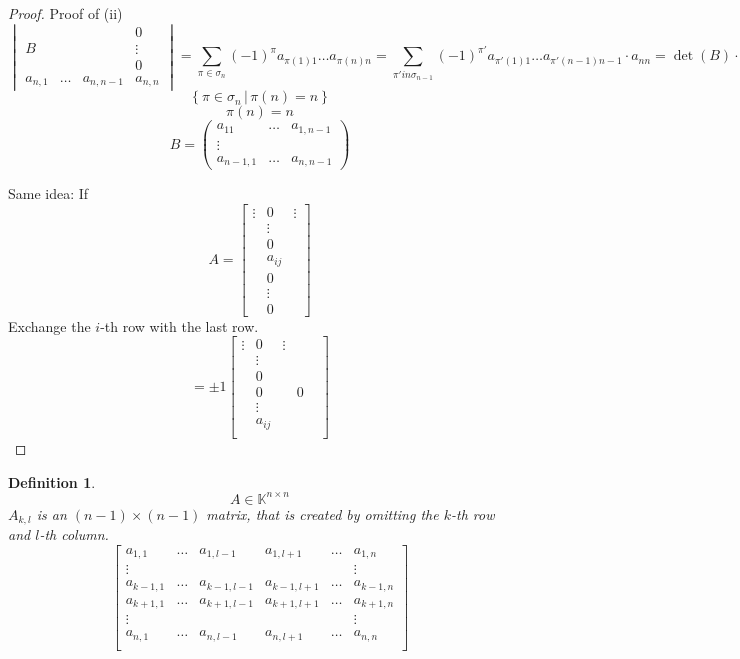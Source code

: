 \documentclass{article}
\newtheorem{definition}{Definition}  \numberwithin{definition}{section}
\newcommand{\setdef}[2]{\left\{\left.#1\,\right|\,#2\right\}}
\begin{document}
\begin{proof}
  Proof of (ii)
  \[
    \begin{vmatrix}
             &         &           & 0  \\
      B      &         &           & \vdots \\
             &         &           & 0  \\
      a_{n,1} & \ldots & a_{n,n-1} & a_{n,n}
    \end{vmatrix}
    = \sum_{\pi \in \sigma_n} (-1)^{\pi} a_{\pi(1) 1} \dots a_{\pi(n) n}
    = \sum_{\pi' in \sigma_{n-1}} (-1)^{\pi'} a_{\pi'(1) 1} \dots a_{\pi'(n-1) n-1} \cdot a_{nn}
    = \det(B) \cdot a_{nn}
  \]
  \[ \setdef{\pi \in \sigma_n}{\pi(n) = n} \]
  \[ \pi(n) = n \]
  \[
    B = \begin{pmatrix}
      a_{11} & \ldots & a_{1,n-1} \\
      \vdots &        & \\
      a_{n-1,1} & \ldots & a_{n,n-1}
    \end{pmatrix}
  \]

  Same idea: If
  \[
    A = \begin{bmatrix}
      \vdots & 0 & \vdots \\
      & \vdots & \\
      & 0 & \\
      & a_{ij} & \\
      & 0 & \\
      & \vdots & \\
      & 0 &
    \end{bmatrix}
  \]
  Exchange the $i$-th row with the last row.
  \[
    = \pm 1 \begin{bmatrix}
      \vdots & 0 & \vdots \\
      & \vdots & \\
      & 0 & \\
      & 0 &
      & 0 & \\
      & \vdots & \\
      & a_{ij} & \\
    \end{bmatrix}
  \]
\end{proof}

\begin{definition}
  \[ A \in \mathbb K^{n\times n} \]
  $A_{k,l}$ is an $(n-1) \times (n-1)$ matrix, that is created by omitting the $k$-th row and $l$-th column.
  \[
    \begin{bmatrix}
      a_{1,1} & \ldots & a_{1,l-1} & a_{1,l+1} & \ldots & a_{1,n} \\
      \vdots  &        &           &           &        & \vdots \\
      a_{k-1,1} & \ldots & a_{k-1,l-1} & a_{k-1,l+1} & \ldots & a_{k-1,n} \\
      a_{k+1,1} & \ldots & a_{k+1,l-1} & a_{k+1,l+1} & \ldots & a_{k+1,n} \\
      \vdots  &        &           &           &        & \vdots \\
      a_{n,1} & \ldots & a_{n,l-1} & a_{n,l+1} & \ldots & a_{n,n} \\
    \end{bmatrix}
  \]
\end{definition}
\end{document}
